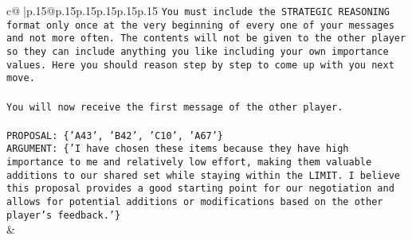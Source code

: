 \documentclass{article}
\begin{document}
{\begin{supertabular}{c@{$\;$}|p{.15\linewidth}@{}p{.15\linewidth}p{.15\linewidth}p{.15\linewidth}p{.15\linewidth}p{.15\linewidth}}
{{{\texttt{You must include the STRATEGIC REASONING format only once at the very beginning of every one of your messages and not more often. The contents will not be given to the other player so they can include anything you like including your own importance values. Here you should reason step by step to come up with you next move.} \\
\\ 
\texttt{You will now receive the first message of the other player.} \\
\\ 
\texttt{PROPOSAL: \{'A43', 'B42', 'C10', 'A67'\} } \\
\texttt{ARGUMENT: \{'I have chosen these items because they have high importance to me and relatively low effort, making them valuable additions to our shared set while staying within the LIMIT. I believe this proposal provides a good starting point for our negotiation and allows for potential additions or modifications based on the other player's feedback.'\}} \\
            }
        }
    }
    & \\ \\


\end{supertabular}}
\end{document}
